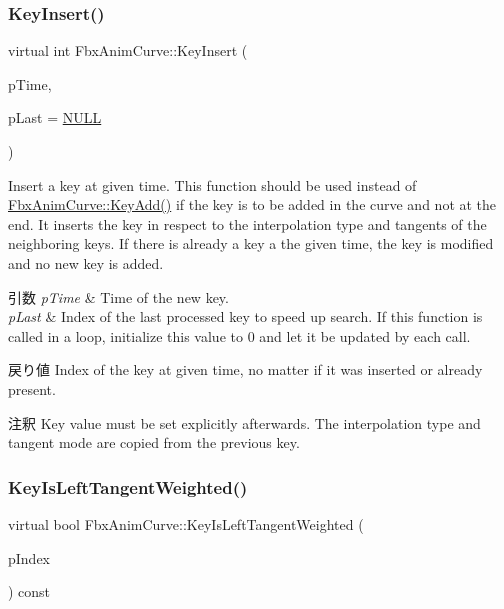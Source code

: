 \subsubsection{\texorpdfstring{Key\+Insert()}{KeyInsert()}}
{\footnotesize\ttfamily virtual int Fbx\+Anim\+Curve\+::\+Key\+Insert (\begin{DoxyParamCaption}\item[{\hyperlink{class_fbx_time}{Fbx\+Time}}]{p\+Time,  }\item[{int $\ast$}]{p\+Last = {\ttfamily \hyperlink{fbxarch_8h_a070d2ce7b6bb7e5c05602aa8c308d0c4}{N\+U\+LL}} }\end{DoxyParamCaption})\hspace{0.3cm}{\ttfamily [pure virtual]}}

Insert a key at given time. This function should be used instead of \hyperlink{class_fbx_anim_curve_aefac9bf8a5d7bf1fe147e192ba503737}{Fbx\+Anim\+Curve\+::\+Key\+Add()} if the key is to be added in the curve and not at the end. It inserts the key in respect to the interpolation type and tangents of the neighboring keys. If there is already a key a the given time, the key is modified and no new key is added. 
\begin{DoxyParams}{引数}
{\em p\+Time} & Time of the new key. \\
\hline
{\em p\+Last} & Index of the last processed key to speed up search. If this function is called in a loop, initialize this value to 0 and let it be updated by each call. \\
\hline
\end{DoxyParams}
\begin{DoxyReturn}{戻り値}
Index of the key at given time, no matter if it was inserted or already present. 
\end{DoxyReturn}
\begin{DoxyRemark}{注釈}
Key value must be set explicitly afterwards. The interpolation type and tangent mode are copied from the previous key. 
\end{DoxyRemark}
\mbox{\label{class_fbx_anim_curve_af73a0bbb95ba2c7516438b68de733f1a}} 
\subsubsection{\texorpdfstring{Key\+Is\+Left\+Tangent\+Weighted()}{KeyIsLeftTangentWeighted()}}
{\footnotesize\ttfamily virtual bool Fbx\+Anim\+Curve\+::\+Key\+Is\+Left\+Tangent\+Weighted (\begin{DoxyParamCaption}\item[{int}]{p\+Index }\end{DoxyParamCaption}) const\hspace{0.3cm}{\ttfamily [pure virtual]}}

